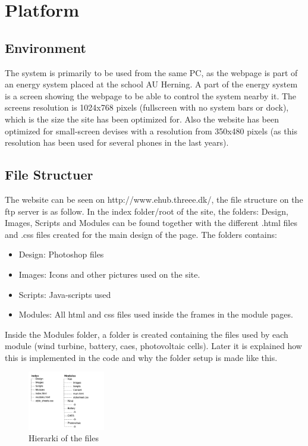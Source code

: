 \newpage
\chapter{Platform}
\section{Environment}
The system is primarily to be used from the same PC, as the webpage is part of an energy system
placed at the school AU Herning. A part of the energy system is a screen showing the webpage to
be able to control the system nearby it. The screens resolution is 1024x768 pixels (fullscreen with no system bars or dock), 
which is the size the site has been optimized for. Also the website has been optimized for small-screen devises with a resolution from 350x480 pixels (as this resolution has been used for several phones in the last years).
\section{File Structuer}
The website can be seen on http://www.ehub.threee.dk/, the file structure on the ftp server is as follow. In the index folder/root of the site, the folders: Design, Images, Scripts and Modules can be found together with the different .html files and .css files created for the main design of the page. The folders contains:
\begin{itemize}
	\item Design: Photoshop files
	\item Images: Icons and other pictures used on the site.
	\item Scripts: Java-scripts used
	\item Modules: All html and css files used inside the frames in the module pages.
\end{itemize}
Inside the Modules folder, a folder is created containing the files used by each module (wind turbine, battery, caes, photovoltaic cells). Later it is explained how this is implemented in the code and why the folder setup is made like this.
\begin{figure}[htbp]
	\center
	\includegraphics[width=0.3\textwidth]{images/hierarki.png} %
   	\caption{Hierarki of the files}
   	\label{fig:file_hierarki}
\end{figure}
